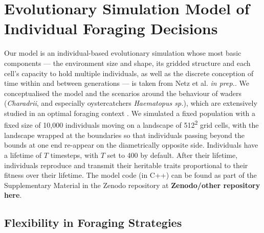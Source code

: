 \documentclass[11pt]{article}
\begin{document}
\section*{Evolutionary Simulation Model of Individual Foraging Decisions}

Our model is an individual-based evolutionary simulation whose most basic components --- the environment size and shape, its gridded structure and each cell's capacity to hold multiple individuals, as well as the discrete conception of time within and between generations --- is taken from Netz et al. \textit{in prep.}.
We conceptualised the model and the scenarios around the behaviour of waders (\textit{Charadrii}, and especially oystercatchers \textit{Haematopus sp.}), which are extensively studied in an optimal foraging context \citep[e.g. ][]{vahl2005, vahl2005a, vahl2005b, ENS1990219}.
We simulated a fixed population with a fixed size of 10,000 individuals moving on a landscape of 512\textsuperscript{2} grid cells, with the landscape wrapped at the boundaries so that individuals passing beyond the bounds at one end re-appear on the diametrically opposite side.
Individuals have a lifetime of $T$ timesteps, with $T$ set to 400 by default.
After their lifetime, individuals reproduce and transmit their heritable traits proportional to their fitness over their lifetime.
The model code (in C++) can be found as part of the Supplementary Material in the Zenodo repository at \textbf{Zenodo/other repository here}.

\subsection*{Flexibility in Foraging Strategies}
\end{document}
